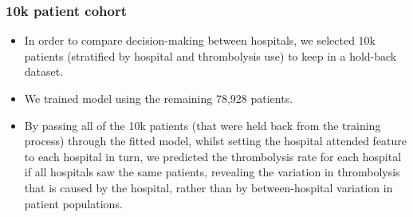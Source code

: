\begin{frame}
\frametitle{10k patient cohort}

\begin{itemize}

    
    \setlength{\itemsep}{4mm}
    \item In order to compare decision-making between hospitals, we selected 10k patients (stratified by hospital and thrombolysis use) to keep in a hold-back dataset.

    \item We trained model using the remaining 78,928 patients. 
    
    \item By passing all of the 10k patients (that were held back from the training process) through the fitted model, whilst setting the hospital attended feature to each hospital in turn, we predicted the thrombolysis rate for each hospital if all hospitals saw the same patients, revealing the variation in thrombolysis that is caused by the hospital, rather than by between-hospital variation in patient populations.
\end{itemize}
    
\end{frame}